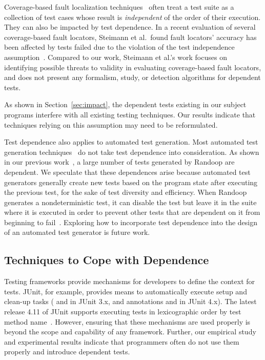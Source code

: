 Coverage-based fault localization techniques~\cite{Jones:2002:VTI}
often treat a test suite as a collection of test cases
whose result is \textit{independent} of the order of their
execution. They can also be impacted by test dependence.
In a recent evaluation of several coverage-based fault locators,
 Steimann et al.\ found fault locators' accuracy has been 
 affected by tests failed due to the violation of the test
 independence assumption~\cite{Steimann:2013}. 
 Compared to our work, Steimann et al.'s
 work focuses on identifying possible threats to validity
 in evaluating coverage-based fault locators, and does
 not present any formalism, study, or detection algorithms
 for dependent tests.

As shown in Section~\ref{sec:impact},
the dependent tests existing in our subject programs interfere with
all existing  testing techniques. Our results indicate that
techniques relying on this assumption may need to be reformulated.

Test dependence also applies to automated test generation.
Most automated test generation
techniques~\cite{PachecoLET2007, Wang:2007:AGC,
ZhangSBE2011} do not take test dependence
into consideration. As shown in our
previous work~\cite{testdependence, RobinsonEPAL2011},
a large number of tests generated by Randoop are dependent.
We speculate that these dependences arise because automated
test generators generally create new tests
based on the program state after executing the previous test,
for the sake of test diversity and efficiency. 
When Randoop generates a nondeterministic test, it can disable the test but
leave it in the suite where it is executed in order to prevent other tests
that are dependent on it from beginning to fail~\cite{RobinsonEPAL2011}.
Exploring how to incorporate test dependence into the design of an automated
test generator is future work.


\subsection{Techniques to Cope with Dependence}

Testing frameworks provide mechanisms
for developers to define the context for tests.
JUnit, for example, provides means to
automatically execute setup and clean-up tasks
( and  in JUnit
3.x, and annotations  and  in
JUnit 4.x). The latest release 4.11 of JUnit supports
executing tests in lexicographic order by test method name~\cite{junitordering}.
However, ensuring that these mechanisms are used properly is
beyond the scope and capability of any framework. 
Further, our empirical study and
experimental results indicate that programmers often do not
use them properly and introduce dependent tests. 

